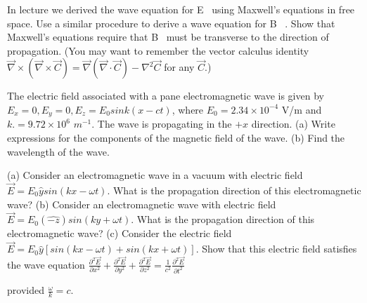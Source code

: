 \documentclass[11pt,letterpaper,boxed]{hmcpset}
\begin{document}
\begin{problem} In lecture we derived the wave equation for E~ using Maxwell’s equations in free space. Use a
similar procedure to derive a wave equation for B~ . Show that Maxwell’s equations require that
B~ must be transverse to the direction of propagation. (You may want to remember the vector
calculus identity $\vec{\nabla} \times (\vec{\nabla} \times \vec{C}) = \vec{\nabla} (\vec{\nabla} \cdot \vec{C}) - \nabla^2 \vec{C}$ for any $\vec{C}$.)
	\end{problem}
	\begin{solution}
		\vfill
	\end{solution}
	\newpage
	
\begin{problem} [HRK E38.16] The electric field associated with a pane electromagnetic wave is given by $E_x = 0, E_y = 0, E_z = E_0 sin k(x - ct)$, where $E_0 = 2.34 \times 10^{-4}$ V/m and $k .= 9.72 \times 10^6$ $m^{-1}$. The wave is propagating in the $+x$ direction. (a) Write expressions for the components of the magnetic field of the wave. (b) Find the wavelength of the wave.
	\end{problem}
	\begin{solution}
		\vfill
	\end{solution}
	\newpage
	
\begin{problem}  (a) Consider an electromagnetic wave in a vacuum with electric field $\vec{E} = E_0 \hat{y} sin(kx - \omega t)$.
What is the propagation direction of this electromagnetic wave?
(b) Consider an electromagnetic wave with electric field $\vec{E} = E_0 (\hat{-z}) sin(ky + \omega t)$. What is the
propagation direction of this electromagnetic wave?
(c) Consider the electric field $\vec{E} = E_0 \hat{y} [sin(kx - \omega t) + sin(kx + \omega t)]$. Show that this electric field
satisfies the wave equation $\frac{\partial^2 \vec{E}}{\partial x^2} + \frac{\partial^2 \vec{E}}{\partial y^2} + \frac{\partial^2 \vec{E}}{\partial z^2} = \frac{1}{c^2} \frac{\partial^2 \vec{E}}{\partial t^2}$

provided $\frac{\omega}{k} = c$.
	\end{problem}
	\begin{solution}
		\vfill
	\end{solution}
	\newpage
	
\end{document}
